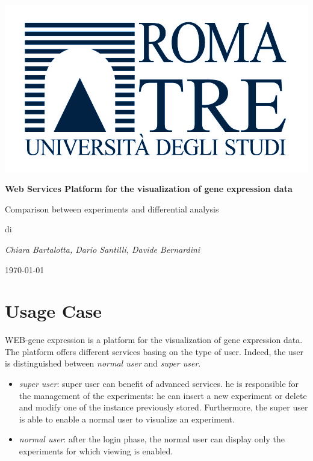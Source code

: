 \documentclass[a4paper]{report}
\begin{document}
\begin{titlepage}
\centering
{}
\includegraphics{logoRomaTre.jpg}\\
{\LARGE \bf Web Services Platform for the visualization of gene expression data\par}
\vspace{0.5cm}
{\Large Comparison between experiments and differential analysis\par} 
\vspace{2cm}
di\\
{\Large \em Chiara Bartalotta, Dario Santilli, Davide Bernardini\par}
\date{\currenttime}
\today
\end{titlepage}

\tableofcontents

\chapter{Usage Case}
WEB-gene expression is a platform for the visualization of gene expression data. The platform offers different services basing on the type of user. Indeed, the user is distinguished between \emph{normal user} and \emph{super user}.
\begin{itemize}
   \item \textit{super user}: super user can benefit of advanced services. he is responsible for the management of the experiments: he can insert a new experiment or delete and modify one of the instance previously stored. Furthermore, the super user is able to enable a normal user to visualize an experiment. 
   \item \textit{normal user}: after the login phase, the normal user can display only the experiments for which viewing is enabled.
\end{itemize}
\end{document}
